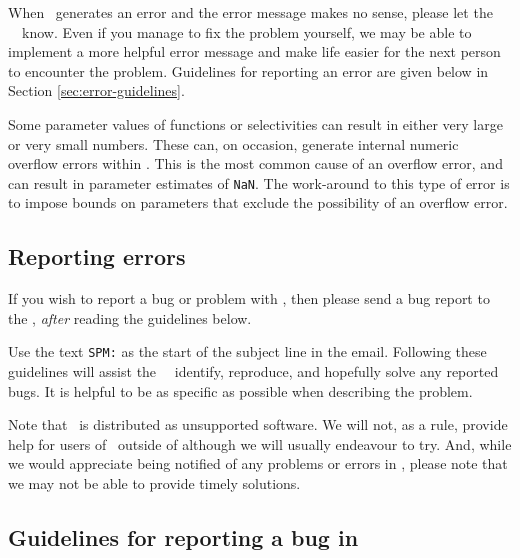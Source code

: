 When \SPM\ generates an error and the error message makes no sense, please let the \SPM\ \authors\ know. Even if you manage to fix the problem yourself, we may be able to implement a more helpful error message and make life easier for the next person to encounter the problem. Guidelines for reporting an error are given below in Section \ref{sec:error-guidelines}.

Some parameter values of functions or selectivities can result in either very large or very small numbers. These can, on occasion, generate internal numeric overflow errors within \SPM. This is the most common cause of an overflow error, and can result in parameter estimates of \texttt{NaN}. The work-around to this type of error is to impose bounds on parameters that exclude the possibility of an overflow error.

\subsection{Reporting errors\label{sec:reporting-errors}}

If you wish to report a bug or problem with \SPM, then please send a bug report to the \authors, \emph{after} reading the guidelines below. 

Use the text \texttt{SPM:} as the start of the subject line in the email. Following these guidelines will assist the \SPM\ \authors\ identify, reproduce, and hopefully solve any reported bugs. It is helpful to be as specific as possible when describing the problem.

Note that \SPM\ is distributed as unsupported software. We will not, as a rule, provide help for users of \SPM\ outside of \href{http://www.niwa.co.nz}{\Organisation} \textemdash although we will usually endeavour to try. And, while we would appreciate being notified of any problems or errors in \SPM, please note that we may not be able to provide timely solutions.

\subsection{Guidelines for reporting a bug in \SPM\label{sec:error-guidelines}}


